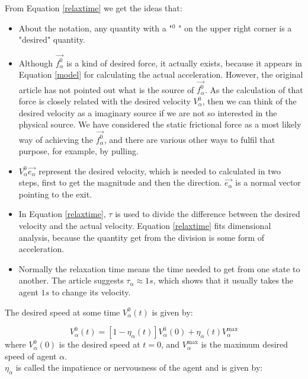 From Equation \ref{relaxtime} we get the ideas that:
\begin{itemize}
\item About the notation, any quantity with a "$ ^{0} $ " on the upper right corner is a "desired" quantity.
\item Although $ \vec{f^{0}_{\alpha}} $ is a kind of desired force, it actually exists, because it appears in Equation \ref{model} for calculating the actual acceleration. However, the original article has not pointed out what is the source of  $ \vec{f^{0}_{\alpha}} $.  As the calculation of that force is closely related with the desired velocity $V_{\alpha}^{0}$, then we can think of the desired velocity as a imaginary source if we are not so interested in the physical source. We have considered the static frictional force as a most likely way of achieving the $ \vec{f^{0}_{\alpha}} $, and there are various other ways to fulfil that purpose, for example, by pulling.
\item $ V_{\alpha}^{0} \vec{e_{\alpha}} $ represent the desired velocity, which is needed to calculated in two steps, first to get the magnitude and then the direction. $ \vec{e_{\alpha}} $ is a normal vector pointing to the exit.
\item In Equation \ref{relaxtime}, $\tau$ is used to divide the difference between the desired velocity and the actual velocity. Equation \ref{relaxtime} fits dimensional analysis, because the quantity get from the division is some form of acceleration. 
\item Normally the relaxation time means the time needed to get from one state to another. The article \cite{self-org} suggests $ \tau_{\alpha}\approx 1s $, which shows that it usually takes the agent $ 1s $ to change its velocity.
\end{itemize}
The desired speed at some time $V_{\alpha}^{0}\left( t \right)$ is given by:

\begin{equation}\label{v0eta}
    V_{\alpha}^{0}\left( t \right) = \left[ 1 - \eta_{\alpha} \left( t \right) \right] 
    V_{\alpha}^{0} \left( 0 \right) +
    \eta_{\alpha} \left( t \right)V_{\alpha}^{\text{max}}
\end{equation}
where $V_{\alpha}^{0} \left( 0 \right)$ is the desired speed at $ t=0 $, and $V_{\alpha}^{\text{max}}$ is the maximum desired speed of agent
$\alpha$. \\
$\eta_{\alpha}$ is called the impatience or nervousness of the agent and is given by:

